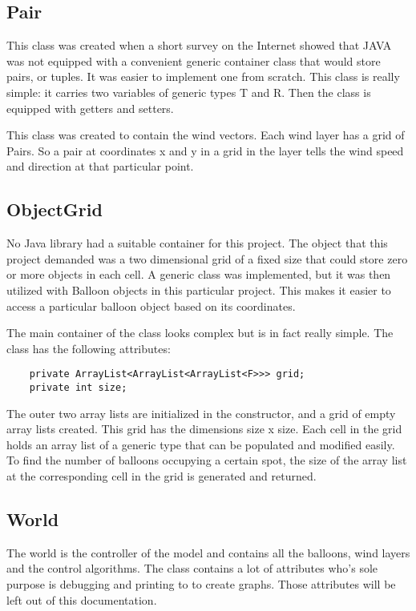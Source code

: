 \subsection{Pair}
This class was created when a short survey on the Internet showed that JAVA was not equipped with a convenient generic container class that would store pairs, or tuples. It was easier to implement one from scratch. This class is really simple: it carries two variables of generic types T and R. Then the class is equipped with getters and setters. 

This class was created to contain the wind vectors. Each wind layer has a grid of Pairs. So a pair at coordinates x and y in a grid in the layer tells the wind speed and direction at that particular point.

\subsection{ObjectGrid}
No Java library had a suitable container for this project. The object that this project demanded was a two dimensional grid of a fixed size that could store zero or more objects in each cell. A generic class was implemented, but it was then utilized with Balloon objects in this particular project. This makes it easier to access a particular balloon object based on its coordinates.

The main container of the class looks complex but is in fact really simple. The class has the following attributes:

\begin{lstlisting}
    private ArrayList<ArrayList<ArrayList<F>>> grid;
    private int size;
\end{lstlisting}

The outer two array lists are initialized in the constructor, and a grid of empty array lists created. This grid has the dimensions size x size. Each cell in the grid holds an array list of a generic type that can be populated and modified easily. To find the number of balloons occupying a certain spot, the size of the array list at the corresponding cell in the grid is generated and returned.

\subsection{World}
The world is the controller of the model and contains all the balloons, wind layers and the control algorithms. The class contains a lot of attributes who's sole purpose is debugging and printing to to create graphs. Those attributes will be left out of this documentation. 

